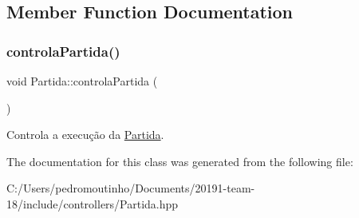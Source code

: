 \subsection{Member Function Documentation}
\mbox{\label{class_partida_ac33f17557cd766c7daccdc26dcaba906}} 
\subsubsection{\texorpdfstring{controlaPartida()}{controlaPartida()}}
{\footnotesize\ttfamily void Partida\+::controla\+Partida (\begin{DoxyParamCaption}{ }\end{DoxyParamCaption})}



Controla a execução da \mbox{\hyperlink{class_partida}{Partida}}. 



The documentation for this class was generated from the following file\+:\begin{DoxyCompactItemize}
\item 
C\+:/\+Users/pedromoutinho/\+Documents/20191-\/team-\/18/include/controllers/Partida.\+hpp\end{DoxyCompactItemize}
